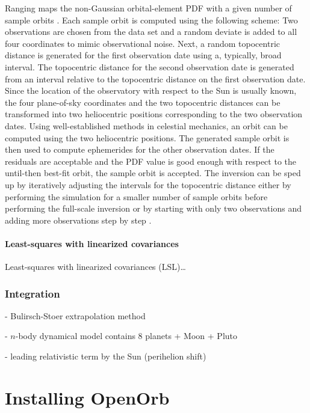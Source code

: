 \documentclass[12pt,english,twoside,a4paper]{report}
\begin{document}
Ranging maps the non-Gaussian orbital-element PDF with a given
number of sample orbits \cite{vir2001a,mui2001a}. Each sample orbit is
computed using the following scheme: Two observations are chosen from
the data set and a random deviate is added to all four coordinates to
mimic observational noise. Next, a random topocentric distance is
generated for the first observation date using a, typically, broad
interval. The topocentric distance for the second observation date is
generated from an interval relative to the topocentric distance on the
first observation date. Since the location of the observatory with
respect to the Sun is usually known, the four plane-of-sky coordinates
and the two topocentric distances can be transformed into two
heliocentric positions corresponding to the two observation
dates. Using well-established methods in celestial mechanics, an orbit
can be computed using the two heliocentric positions. The generated
sample orbit is then used to compute ephemerides for the other
observation dates. If the residuals are acceptable and the
PDF value is good enough with respect to the until-then best-fit
orbit, the sample orbit is accepted. The inversion can be sped up by
iteratively adjusting the intervals for the topocentric distance
either by performing the simulation for a smaller number of sample
orbits before performing the full-scale inversion \cite{vir2003a} or
by starting with only two observations and adding more observations
step by step \cite{gra2005c}.

\subsubsection{Least-squares with linearized covariances}

Least-squares with linearized covariances (LSL)\ldots

\subsection{Integration}

- Bulirsch-Stoer extrapolation method

- $n$-body dynamical model contains 8 planets + Moon + Pluto

- leading relativistic term by the Sun (perihelion shift)

\chapter{Installing OpenOrb}
\end{document}
